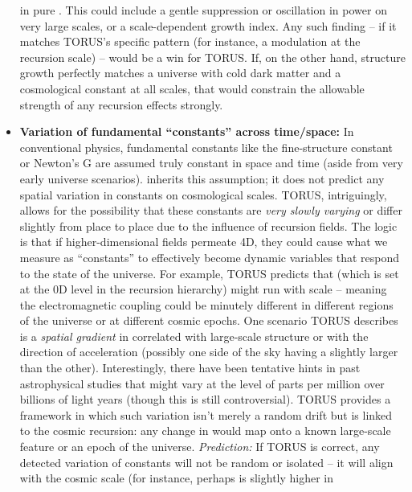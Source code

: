 \documentclass[
]{article}
\begin{document}
\begin{itemize}
  in pure \LambdaCDM\hspace{0pt}. This could include a gentle suppression or
  oscillation in power on very large scales, or a scale-dependent growth
  index. Any such finding -- if it matches TORUS's specific pattern (for
  instance, a modulation at the recursion scale) -- would be a win for
  TORUS. If, on the other hand, structure growth perfectly matches a
  \LambdaCDM universe with cold dark matter and a cosmological constant at all
  scales, that would constrain the allowable strength of any recursion
  effects strongly.
\item
  \textbf{Variation of fundamental ``constants'' across time/space:} In
  conventional physics, fundamental constants like the fine-structure
  constant \alpha or Newton's G are assumed truly constant in space and time
  (aside from very early universe scenarios). \LambdaCDM inherits this
  assumption; it does not predict any spatial variation in constants on
  cosmological scales. TORUS, intriguingly, allows for the possibility
  that these constants are \emph{very slowly varying} or differ slightly
  from place to place due to the influence of recursion fields. The
  logic is that if higher-dimensional fields permeate 4D, they could
  cause what we measure as ``constants'' to effectively become dynamic
  variables that respond to the state of the universe. For example,
  TORUS predicts that \alpha (which is set at the 0D level in the recursion
  hierarchy) might run with scale -- meaning the electromagnetic
  coupling could be minutely different in different regions of the
  universe or at different cosmic epochs\hspace{0pt}. One scenario TORUS
  describes is a \emph{spatial gradient} in \alpha correlated with
  large-scale structure or with the direction of acceleration (possibly
  one side of the sky having a slightly larger \alpha than the
  other)\hspace{0pt}. Interestingly, there have been tentative hints in
  past astrophysical studies that \alpha might vary at the level of parts per
  million over billions of light years (though this is still
  controversial). TORUS provides a framework in which such variation
  isn't merely a random drift but is linked to the cosmic recursion: any
  change in \alpha would map onto a known large-scale feature or an epoch of
  the universe. \emph{Prediction:} If TORUS is correct, any detected
  variation of constants will not be random or isolated -- it will align
  with the cosmic scale (for instance, perhaps \alpha is slightly higher in

\end{itemize}
\end{document}
